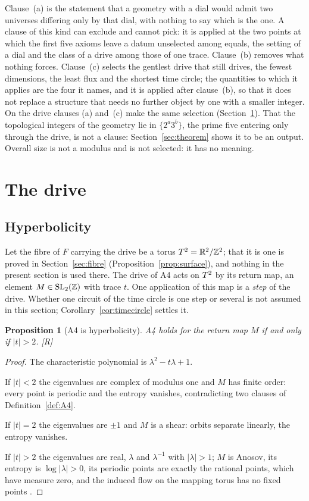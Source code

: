 \documentclass[11pt,a4paper]{article}
\theoremstyle{plain}
\newtheorem{proposition}[theorem]{Proposition}
\theoremstyle{definition}
\theoremstyle{remark}
\newcommand{\rigR}{[\textup{R}]}
\begin{document}
Clause~(a) is the statement that a geometry with a dial would admit two universes differing only by that dial, with nothing to say which is the one. A clause of this kind can exclude and cannot pick: it is applied at the two points at which the first five axioms leave a datum unselected among equals, the setting of a dial and the class of a drive among those of one trace. Clause~(b) removes what nothing forces. Clause~(c) selects the gentlest drive that still drives, the fewest dimensions, the least flux and the shortest time circle; the quantities to which it applies are the four it names, and it is applied after clause~(b), so that it does not replace a structure that needs no further object by one with a smaller integer. On the drive clauses (a) and~(c) make the same selection (Section~\ref{sec:drive}). That the topological integers of the geometry lie in $\{2^{a}3^{b}\}$, the prime five entering only through the drive, is not a clause: Section~\ref{sec:theorem} shows it to be an output. Overall size is not a modulus and is not selected: it has no meaning.

\section{The drive}\label{sec:drive}

\subsection{Hyperbolicity}

Let the fibre of $F$ carrying the drive be a torus $T^2=\mathbb{R}^{2}/\mathbb{Z}^{2}$; that it is one is proved in Section~\ref{sec:fibre} (Proposition~\ref{prop:surface}), and nothing in the present section is used there. The drive of A4 acts on $T^2$ by its return map, an element $M\in\mathrm{SL}_{2}(\mathbb{Z})$ with trace $t$. One application of this map is a \emph{step} of the drive. Whether one circuit of the time circle is one step or several is not assumed in this section; Corollary~\ref{cor:timecircle} settles it.

\begin{proposition}[A4 is hyperbolicity]\label{prop:hyp}
A4 holds for the return map $M$ if and only if $\lvert t\rvert>2$. \rigR
\end{proposition}

\begin{proof}
The characteristic polynomial is $\lambda^{2}-t\lambda+1$.

If $\lvert t\rvert<2$ the eigenvalues are complex of modulus one and $M$ has finite order: every point is periodic and the entropy vanishes, contradicting two clauses of Definition~\ref{def:A4}.

If $\lvert t\rvert=2$ the eigenvalues are $\pm1$ and $M$ is a shear: orbits separate linearly, the entropy vanishes.

If $\lvert t\rvert>2$ the eigenvalues are real, $\lambda$ and $\lambda^{-1}$ with $\lvert\lambda\rvert>1$; $M$ is Anosov, its entropy is $\log\lvert\lambda\rvert>0$, its periodic points are exactly the rational points, which have measure zero, and the induced flow on the mapping torus has no fixed points \cite{KatokHasselblatt}.
\end{proof}
\end{document}
